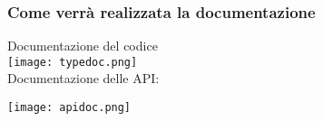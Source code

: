 \begin{frame}
  \frametitle{Come verrà realizzata la documentazione}
  \centering
  Documentazione del codice \\
  \texttt{[image: typedoc.png]} \\
	Documentazione delle API:
  
  \texttt{[image: apidoc.png]}
\end{frame}
